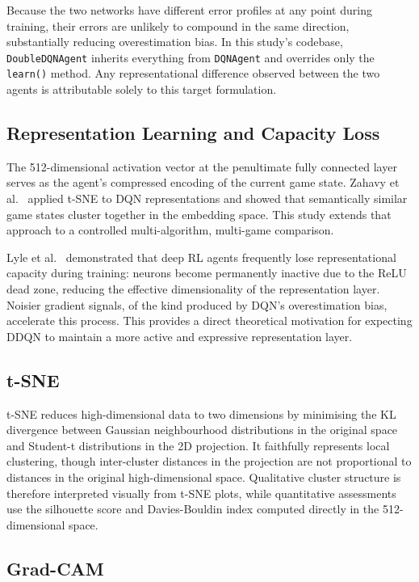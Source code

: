 \documentclass[a4paper]{article}
\begin{document}
Because the two networks have different error profiles at any point during training, their errors are unlikely to compound in the same direction, substantially reducing overestimation bias. In this study's codebase, \texttt{DoubleDQNAgent} inherits everything from \texttt{DQNAgent} and overrides only the \texttt{learn()} method. Any representational difference observed between the two agents is attributable solely to this target formulation.

\subsection{Representation Learning and Capacity Loss}

The 512-dimensional activation vector at the penultimate fully connected layer serves as the agent's compressed encoding of the current game state. Zahavy et al.\ \cite{zahavy2016graying} applied t-SNE to DQN representations and showed that semantically similar game states cluster together in the embedding space. This study extends that approach to a controlled multi-algorithm, multi-game comparison.

Lyle et al.\ \cite{lyle2022understanding} demonstrated that deep RL agents frequently lose representational capacity during training: neurons become permanently inactive due to the ReLU dead zone, reducing the effective dimensionality of the representation layer. Noisier gradient signals, of the kind produced by DQN's overestimation bias, accelerate this process. This provides a direct theoretical motivation for expecting DDQN to maintain a more active and expressive representation layer.

\subsection{t-SNE}

t-SNE \cite{van2008visualizing} reduces high-dimensional data to two dimensions by minimising the KL divergence between Gaussian neighbourhood distributions in the original space and Student-t distributions in the 2D projection. It faithfully represents local clustering, though inter-cluster distances in the projection are not proportional to distances in the original high-dimensional space. Qualitative cluster structure is therefore interpreted visually from t-SNE plots, while quantitative assessments use the silhouette score and Davies-Bouldin index computed directly in the 512-dimensional space.

\subsection{Grad-CAM}
\end{document}
